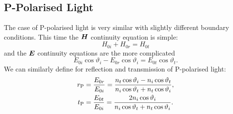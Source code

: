     \subsection{P-Polarised Light}
    The case of P-polarised light is very similar with slightly different boundary conditions.
    This time the \(\bm{H}\) continuity equation is simple:
    \[H_{0i} + H_{0r} = H_{0t}\]
    and the \(\bm{E}\) continuity equations are the more complicated
    \[E_{0i}\cos\vartheta_i - E_{0r}\cos\vartheta_i = E_{0t}\cos\vartheta_t.\]
    We can similarly define  for reflection and transmission of P-polarised light:
    \begin{align*}
        {r}_{\mathrm{{P}}} &= \frac{E_{0r}}{E_{0i}} = \frac{n_t\cos\vartheta_i - n_i\cos\vartheta_t}{n_i\cos\vartheta_t + n_t\cos\vartheta_i},\\
        {t}_{\mathrm{{P}}} &= \frac{E_{0t}}{E_{0i}} = \frac{2n_i\cos\vartheta_i}{n_i\cos\vartheta_t + n_t\cos\vartheta_i}.\\
    \end{align*}

